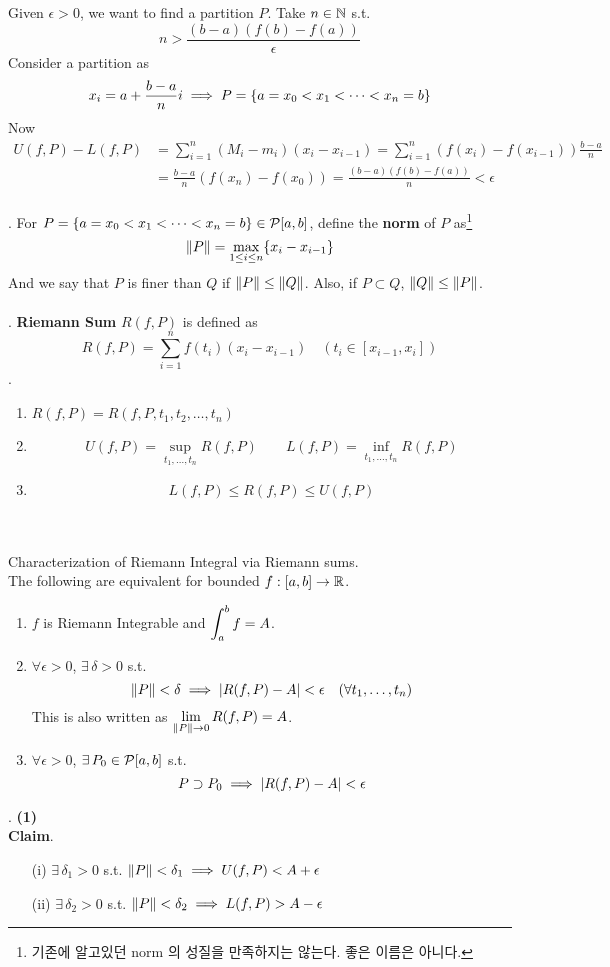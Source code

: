Given $\epsilon > 0$, we want to find a partition $P$. Take $n\in \mathbb{N}$ s.t. $$n > \frac{(b-a)(f(b)-f(a))}{\epsilon}$$
Consider a partition as $$x_i = a+ \frac{b-a}{n}i \implies P = \{a =x_0 < x_1 < \cdots < x_n = b \}$$
Now 
$$\begin{aligned}
	U(f, P) - L(f, P) &= \sum_{i=1}^n (M_i-m_i)(x_i - x_{i-1})  = \sum_{i=1}^n (f(x_i) - f(x_{i-1})) \frac{b-a}{n}\\
	&=\frac{b-a}{n} (f(x_n)-f(x_0)) = \frac{(b-a)(f(b)-f(a))}{n} < \epsilon
\end{aligned}$$
\\
. For $P = \{a = x_0 < x_1 < \cdots < x_n = b \}\in \mathcal{P}[a, b]$, define the \textbf{norm} of $P$ as\footnote{기존에 알고있던 norm 의 성질을 만족하지는 않는다. 좋은 이름은 아니다.}
$$\left\lVert P\right\rVert = \max_{1\leq i \leq n} \{x_i - x_{i-1}\}$$
And we say that $P$ is finer than $Q$ if $\left\lVert P\right\rVert \leq \left\lVert Q\right\rVert$. Also, if $P\subset Q$, $\left\lVert Q\right\rVert\leq \left\lVert P\right\rVert$.\\
\\
. \textbf{Riemann Sum} $R(f, P)$ is defined as
$$R(f, P) = \sum_{i=1}^n f(t_i)(x_i-x_{i-1}) \quad (t_i\in [x_{i-1}, x_i])$$
\rmk. 
\begin{enumerate}
	\item $R(f, P) = R(f, P, t_1, t_2, \dots, t_n)$
	\item $$U(f, P) = \sup_{t_1, \dots, t_n} R(f, P)
	\qquad L(f, P) = \inf_{t_1, \dots, t_n} R(f, P)$$
	\item $$L(f, P) \leq R(f, P) \leq U(f, P)$$
\end{enumerate}~
\\
\\
 Characterization of Riemann Integral via Riemann sums.\\
The following are equivalent for bounded $f:[a, b]\rightarrow \mathbb{R}$.
\begin{enumerate}
	\item $f$ is Riemann Integrable and $\displaystyle \int_a^b f = A$.
	\item $\forall \epsilon > 0$, $\exists\,\delta >0$ s.t. $$\left\lVert P\right\rVert < \delta \implies \left|R(f, P)-A\right| < \epsilon \quad (\forall t_1, \dots, t_n)$$
	This is also written as $\displaystyle \lim_{\left\lVert P\right\rVert\rightarrow0} R(f, P) = A$.
	\item $\forall\epsilon> 0$, $\exists\, P_0\in\mathcal{P}[a, b]$ s.t.
	$$P\supset P_0 \implies \left|R(f, P) - A\right|  < \epsilon$$
\end{enumerate}
\pf. \textbf{(1)}\\
\textbf{Claim}. 
\begin{enumerate}
	\item[(i)] $\exists\,\delta_1 > 0$ s.t. $\left\lVert P\right\rVert < \delta_1 \implies U(f, P) < A + \epsilon$
	\item[(ii)] $\exists\,\delta_2 > 0$ s.t. $\left\lVert P\right\rVert < \delta_2 \implies L(f, P) > A - \epsilon$
\end{enumerate}
